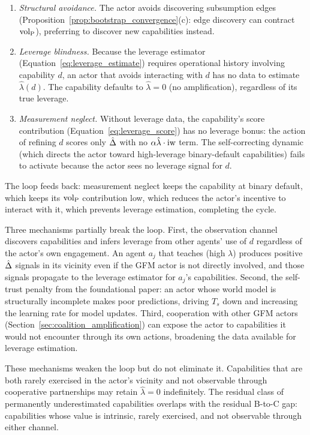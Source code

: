 \begin{enumerate}
\item \emph{Structural avoidance.} The actor avoids discovering subsumption
  edges (Proposition~\ref{prop:bootstrap_convergence}(c): edge discovery can
  contract ${\operatorname{vol}_{\mathrm{P}}}$), preferring to discover new capabilities instead.
\item \emph{Leverage blindness.} Because the leverage estimator
  (Equation~\eqref{eq:leverage_estimate}) requires operational history
  involving capability $d$, an actor that avoids interacting with $d$ has no
  data to estimate $\hat{\lambda}(d)$. The capability defaults to
  $\hat{\lambda} = 0$ (no amplification), regardless of its true leverage.
\item \emph{Measurement neglect.} Without leverage data, the capability's
  score contribution (Equation~\eqref{eq:leverage_score}) has no leverage
  bonus: the action of refining $d$ scores only $\hat{\Delta}$ with no
  $\alpha \hat{\lambda} \cdot \operatorname{iw}$ term. The self-correcting dynamic (which
  directs the actor toward high-leverage binary-default capabilities) fails to
  activate because the actor sees no leverage signal for $d$.
\end{enumerate}

The loop feeds back: measurement neglect keeps the capability at binary
default, which keeps its ${\operatorname{vol}_{\mathrm{P}}}$ contribution low, which reduces the actor's
incentive to interact with it, which prevents leverage estimation, completing
the cycle.

Three mechanisms partially break the loop. First, the observation channel
discovers capabilities and infers leverage from other agents' use of $d$
regardless of the actor's own engagement. An agent $a_j$ that teaches (high
$\lambda$) produces positive $\hat{\Delta}$ signals in its vicinity even if the
GFM actor is not directly involved, and those signals propagate to the
leverage estimator for $a_j$'s capabilities. Second, the self-trust penalty
from the foundational paper: an actor whose world model is structurally
incomplete makes poor predictions, driving $T_s$ down and increasing the
learning rate for model updates. Third, cooperation with other GFM actors
(Section~\ref{sec:coalition_amplification}) can expose the actor to
capabilities it would not encounter through its own actions, broadening the
data available for leverage estimation.

These mechanisms weaken the loop but do not eliminate it. Capabilities that are
both rarely exercised in the actor's vicinity and not observable through
cooperative partnerships may retain $\hat{\lambda} = 0$ indefinitely. The
residual class of permanently underestimated capabilities overlaps with the
residual B-to-C gap: capabilities whose value is intrinsic, rarely exercised,
and not observable through either channel.

